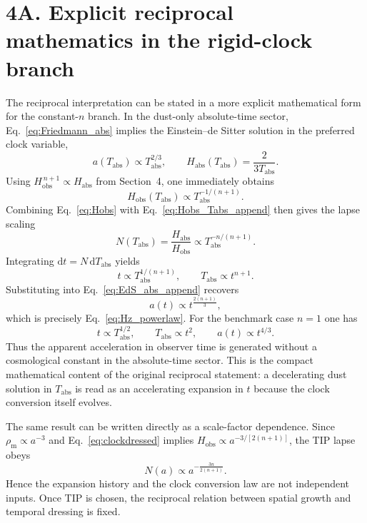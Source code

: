 \documentclass[12pt]{article}
\newcommand{\Tabs}{T_{\mathrm{abs}}}
\newcommand{\Habs}{H_{\mathrm{abs}}}
\newcommand{\Hobs}{H_{\mathrm{obs}}}
\newcommand{\rhom}{\rho_{\mathrm{m}}}
\newcommand{\dd}{\mathrm{d}}
\begin{document}
\section*{4A. Explicit reciprocal mathematics in the rigid-clock branch}
The reciprocal interpretation can be stated in a more explicit mathematical form for the constant-$n$ branch. In the dust-only absolute-time sector, Eq.~\eqref{eq:Friedmann_abs} implies the Einstein--de Sitter solution in the preferred clock variable,
\begin{equation}
a(\Tabs)\propto \Tabs^{2/3},
\qquad
\Habs(\Tabs)=\frac{2}{3\Tabs}.
\label{eq:EdS_abs_append}
\end{equation}
Using $\Hobs^{\,n+1}\propto \Habs$ from Section~4, one immediately obtains
\begin{equation}
\Hobs(\Tabs)\propto \Tabs^{-1/(n+1)}.
\label{eq:Hobs_Tabs_append}
\end{equation}
Combining Eq.~\eqref{eq:Hobs} with Eq.~\eqref{eq:Hobs_Tabs_append} then gives the lapse scaling
\begin{equation}
N(\Tabs)=\frac{\Habs}{\Hobs}\propto \Tabs^{-n/(n+1)}.
\label{eq:N_Tabs_append}
\end{equation}
Integrating $\dd t=N\,\dd \Tabs$ yields
\begin{equation}
t\propto \Tabs^{1/(n+1)},
\qquad
\Tabs\propto t^{n+1}.
\label{eq:tTabs_append}
\end{equation}
Substituting into Eq.~\eqref{eq:EdS_abs_append} recovers
\begin{equation}
a(t)\propto t^{\frac{2(n+1)}{3}},
\end{equation}
which is precisely Eq.~\eqref{eq:Hz_powerlaw}. For the benchmark case $n=1$ one has
\begin{equation}
t\propto \Tabs^{1/2},
\qquad
\Tabs\propto t^{2},
\qquad
a(t)\propto t^{4/3}.
\label{eq:n1_recip_append}
\end{equation}
Thus the apparent acceleration in observer time is generated without a cosmological constant in the absolute-time sector. This is the compact mathematical content of the original reciprocal statement: a decelerating dust solution in $\Tabs$ is read as an accelerating expansion in $t$ because the clock conversion itself evolves.

The same result can be written directly as a scale-factor dependence. Since $\rhom\propto a^{-3}$ and Eq.~\eqref{eq:clockdressed} implies $\Hobs\propto a^{-3/[2(n+1)]}$, the TIP lapse obeys
\begin{equation}
N(a)\propto a^{-\frac{3n}{2(n+1)}}.
\label{eq:Nofa_append}
\end{equation}
Hence the expansion history and the clock conversion law are not independent inputs. Once TIP is chosen, the reciprocal relation between spatial growth and temporal dressing is fixed.
\end{document}

